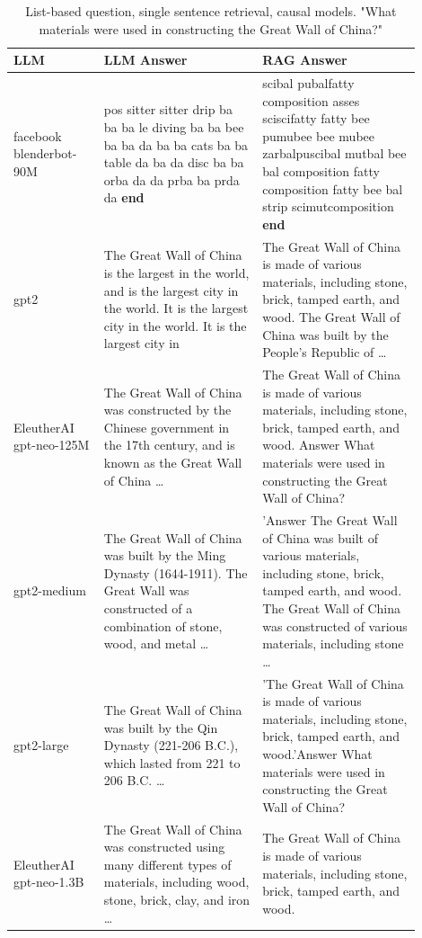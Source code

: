\documentclass{wseas}
\begin{document}
\begin{table}[htbp]
  \centering
  \caption{List-based question, single sentence retrieval, causal models. "What materials were used in constructing the Great Wall of China?"}
  \label{tab:experiment_Q_listBased_R_1Sentence_Q_listBased_M_casualModel_table}  
  \begin{tabular}{|p{0.20\linewidth}|p{0.35\linewidth}|p{0.35\linewidth}|}
    \hline
    \textbf{LLM} & \textbf{LLM Answer} & \textbf{RAG Answer} \\ \hline
    facebook blenderbot-90M & pos sitter sitter drip ba ba ba le diving ba ba bee ba ba da ba ba cats ba ba table da ba da disc ba ba orba da da prba ba prda da \textbf{end} & scibal pubalfatty composition asses sciscifatty fatty bee pumubee bee mubee zarbalpuscibal mutbal bee bal composition fatty composition fatty bee bal strip scimutcomposition \textbf{end} \\ \hline
    gpt2 & The Great Wall of China is the largest in the world, and is the largest city in the world. It is the largest city in the world. It is the largest city in & The Great Wall of China is made of various materials, including stone, brick, tamped earth, and wood. The Great Wall of China was built by the People's Republic of \ldots{} \\ \hline
    EleutherAI gpt-neo-125M & The Great Wall of China was constructed by the Chinese government in the 17th century, and is known as the Great Wall of China \ldots{} & The Great Wall of China is made of various materials, including stone, brick, tamped earth, and wood. Answer What materials were used in constructing the Great Wall of China? \\ \hline
    gpt2-medium & The Great Wall of China was built by the Ming Dynasty (1644-1911). The Great Wall was constructed of a combination of stone, wood, and metal \ldots{} & 'Answer The Great Wall of China was built of various materials, including stone, brick, tamped earth, and wood. The Great Wall of China was constructed of various materials, including stone \ldots{} \\ \hline
    gpt2-large & The Great Wall of China was built by the Qin Dynasty (221-206 B.C.), which lasted from 221 to 206 B.C. \ldots{} & 'The Great Wall of China is made of various materials, including stone, brick, tamped earth, and wood.'Answer What materials were used in constructing the Great Wall of China? \\ \hline
    EleutherAI gpt-neo-1.3B & The Great Wall of China was constructed using many different types of materials, including wood, stone, brick, clay, and iron \ldots{} & The Great Wall of China is made of various materials, including stone, brick, tamped earth, and wood. \\ \hline
  \end{tabular}
\end{table}
\end{document}
